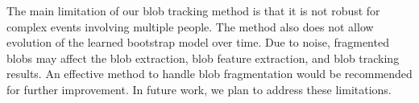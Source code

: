 The main limitation of our blob tracking method is that it is not
robust for complex events involving multiple people. The method also
does not allow evolution of the learned bootstrap model over time. 
Due to noise, fragmented blobs may affect the blob extraction, blob
feature extraction, and blob tracking results. An effective method to
handle blob fragmentation would be recommended for further
improvement.  In future work, we plan to address these limitations.

\FloatBarrier




%


